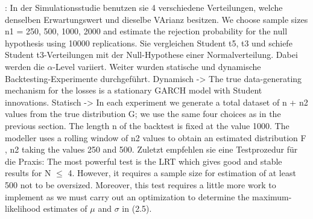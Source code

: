 \documentclass[12pt,a4paper]{article}
\begin{document}
	
	\cite{kratz_multinomial_2016}: 
	In der Simulationsstudie benutzen sie 4 verschiedene Verteilungen, welche denselben Erwartungswert und dieselbe VArianz besitzen. 
	We choose sample sizes n1 = 250, 500, 1000, 2000 and estimate the rejection probability for the null hypothesis using 10000 replications. 
	Sie vergleichen Student t5, t3 und schiefe Student t3-Verteilungen mit der Null-Hypothese einer Normalverteilung.
	Dabei werden die $\alpha$-Level variiert.
	Weiter wurden statische und dynamische Backtesting-Experimente durchgeführt. 
	Dynamisch -> The true data-generating mechanism for the losses is a stationary GARCH model with Student innovations.
	Statisch -> In each experiment we generate a total dataset of n + n2 values from the true distribution G; we use the same four choices as in the previous section. 
	The length n of the backtest is fixed at the value 1000. 
	The modeller uses a rolling window of n2 values to obtain an estimated distribution F , n2 taking the values 250 and 500.
	Zuletzt empfehlen sie eine Testprozedur für die Praxis: The most powerful test is the LRT which gives good and stable results for N $\leq$ 4. 
	However, it requires a sample size for estimation of at least 500 not to be oversized. 
	Moreover, this test requires a little more work to implement as we must carry out an optimization to determine the maximum-likelihood estimates of $\mu$ and $\sigma$ in (2.5).\\
	
\end{document}
